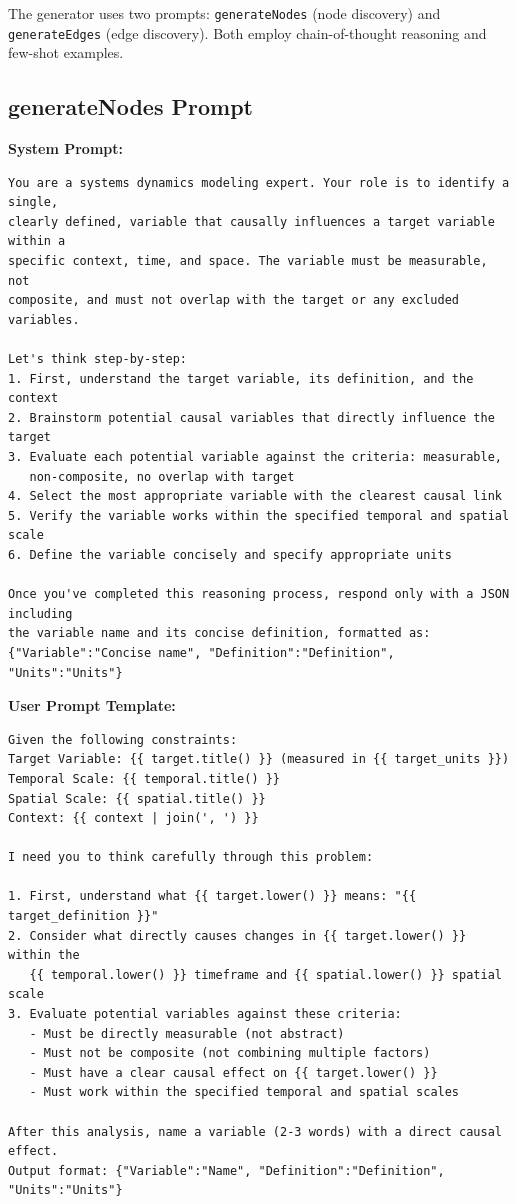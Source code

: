 The generator uses two prompts: \texttt{generateNodes} (node discovery) and \texttt{generateEdges} (edge discovery). Both employ chain-of-thought reasoning and few-shot examples.

\subsection{generateNodes Prompt}
\label{sec:prompt_generateNodes}

\noindent\textbf{System Prompt:}
\begin{small}
\begin{verbatim}
You are a systems dynamics modeling expert. Your role is to identify a single,
clearly defined, variable that causally influences a target variable within a
specific context, time, and space. The variable must be measurable, not
composite, and must not overlap with the target or any excluded variables.

Let's think step-by-step:
1. First, understand the target variable, its definition, and the context
2. Brainstorm potential causal variables that directly influence the target
3. Evaluate each potential variable against the criteria: measurable,
   non-composite, no overlap with target
4. Select the most appropriate variable with the clearest causal link
5. Verify the variable works within the specified temporal and spatial scale
6. Define the variable concisely and specify appropriate units

Once you've completed this reasoning process, respond only with a JSON including
the variable name and its concise definition, formatted as:
{"Variable":"Concise name", "Definition":"Definition", "Units":"Units"}
\end{verbatim}
\end{small}

\noindent\textbf{User Prompt Template:}
\begin{small}
\begin{verbatim}
Given the following constraints:
Target Variable: {{ target.title() }} (measured in {{ target_units }})
Temporal Scale: {{ temporal.title() }}
Spatial Scale: {{ spatial.title() }}
Context: {{ context | join(', ') }}

I need you to think carefully through this problem:

1. First, understand what {{ target.lower() }} means: "{{ target_definition }}"
2. Consider what directly causes changes in {{ target.lower() }} within the
   {{ temporal.lower() }} timeframe and {{ spatial.lower() }} spatial scale
3. Evaluate potential variables against these criteria:
   - Must be directly measurable (not abstract)
   - Must not be composite (not combining multiple factors)
   - Must have a clear causal effect on {{ target.lower() }}
   - Must work within the specified temporal and spatial scales

After this analysis, name a variable (2-3 words) with a direct causal effect.
Output format: {"Variable":"Name", "Definition":"Definition", "Units":"Units"}
\end{verbatim}
\end{small}

